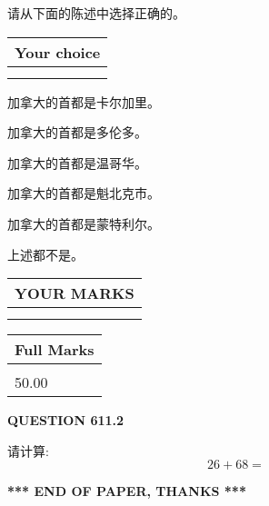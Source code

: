 \documentclass{ctexart}
\begin{document}
  
请从下面的陈述中选择正确的。
  
  
\noindent\hspace{3.0in} \begin{tabular}{|l|}
\hline
Your choice \\
\hline
 \\ 
 \\ 
\hline
\end{tabular}
  
  
 
 
加拿大的首都是卡尔加里。
 
 
加拿大的首都是多伦多。
 
 
加拿大的首都是温哥华。
 
 
加拿大的首都是魁北克市。
 
 
加拿大的首都是蒙特利尔。
 
 
 上述都不是。
 
 
  
\vspace{0.2in}
  
\noindent\begin{tabular}{|l|}
\hline
 YOUR MARKS  \\
\hline
 \\ 
 \\ 
\hline
\end{tabular}
\hspace{0.05in} \begin{tabular}{|l|}
\hline
 Full Marks  \\
\hline
 \\ 
50.00 \\
\hline
\end{tabular}
{\textbf{\Large{QUESTION
611.2 
}}}
  
  
 
请计算:
\begin{equation}
26 +  %
68 = \nonumber
\end{equation}
 

 

 
   
   
 \vspace{0.2in}
 
   
   
   
   
\vspace{1.0in} 
{\textbf{\large{ *** END OF PAPER, THANKS *** }}} 
   
\end{document}
